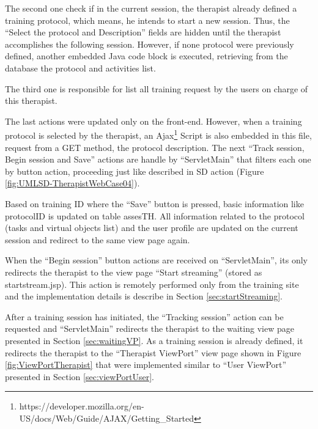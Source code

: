 The second one check if in the current session, the therapist already defined a training protocol, which means, he intends to start a new session. Thus, the ``Select the protocol and Description'' fields are hidden until the therapist accomplishes the following session. However, if none protocol were previously defined, another embedded Java code block is executed, retrieving from the database the protocol and activities list. 

The third one is responsible for list all training request by the users on charge of this therapist.

The last actions were updated only on the front-end. However, when a training protocol is selected by the therapist, an Ajax\footnote{https://developer.mozilla.org/en-US/docs/Web/Guide/AJAX/Getting\_Started} Script is also embedded in this file, request from a GET method, the protocol description. The next ``Track session, Begin session and Save'' actions are handle by ``ServletMain'' that filters each one by button action, proceeding just like described in SD action (Figure \ref{fig:UMLSD-TherapistWebCase04}).

Based on training ID where the ``Save'' button is pressed, basic information like protocolID is updated on table assesTH. All information related to the protocol (tasks and virtual objects list) and the user profile are updated on the current session and redirect to the same view page again. 

When the ``Begin session'' button actions are received on ``ServletMain'', its only redirects the therapist to the view page ``Start streaming'' (stored as startstream.jsp). This action is remotely performed only from the training site and the implementation details is describe in Section \ref{sec:startStreaming}. 

After a training session has initiated, the ``Tracking session'' action can be requested and ``ServletMain'' redirects the therapist to the waiting view page presented in Section \ref{sec:waitingVP}. As a training session is already defined, it redirects the therapist to the ``Therapist ViewPort'' view page shown in Figure \ref{fig:ViewPortTherapist} that were implemented similar to ``User ViewPort'' presented in Section \ref{sec:viewPortUser}.

